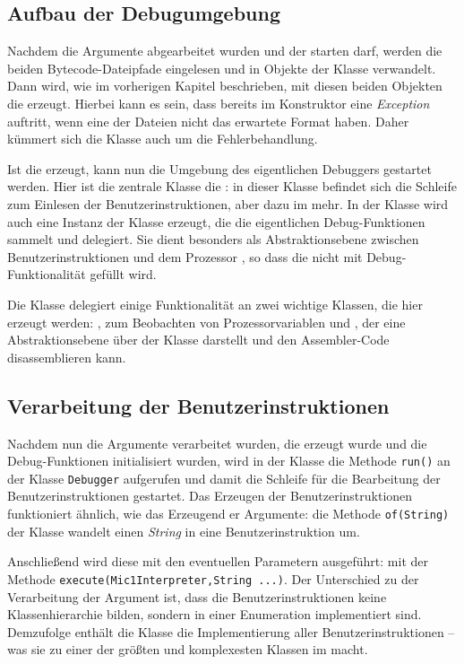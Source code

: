 \subsection{Aufbau der Debugumgebung}
Nachdem die Argumente abgearbeitet wurden und der \md{} starten darf, werden die beiden Bytecode-Dateipfade eingelesen und in Objekte der Klasse  verwandelt. Dann wird, wie im vorherigen Kapitel beschrieben, mit diesen beiden Objekten die \mic{} erzeugt. Hierbei kann es sein, dass bereits im Konstruktor eine \emph{Exception} auftritt, wenn eine der Dateien nicht das erwartete Format haben. Daher kümmert sich die Klasse  auch um die Fehlerbehandlung.

Ist die \mic{} erzeugt, kann nun die Umgebung des eigentlichen Debuggers gestartet werden. Hier ist die zentrale Klasse die : in dieser Klasse befindet sich die Schleife zum Einlesen der Benutzerinstruktionen, aber dazu im  mehr. In der Klasse  wird auch eine Instanz der Klasse  erzeugt, die die eigentlichen Debug-Funktionen sammelt und delegiert. Sie dient besonders als Abstraktionsebene zwischen Benutzerinstruktionen und dem Prozessor \mic{}, so dass die \mic{} nicht mit Debug-Funktionalität gefüllt wird.

Die Klasse  delegiert einige Funktionalität an zwei wichtige Klassen, die hier erzeugt werden: , zum Beobachten von Prozessorvariablen und , der eine Abstraktionsebene über der Klasse  darstellt und den Assembler-Code disassemblieren kann.


\subsection{Verarbeitung der Benutzerinstruktionen}
Nachdem nun die Argumente verarbeitet wurden, die \mic{} erzeugt wurde und die Debug-Funktionen initialisiert wurden, wird in der Klasse  die Methode \texttt{run()} an der Klasse \texttt{Debugger} aufgerufen und damit die Schleife für die Bearbeitung der Benutzerinstruktionen gestartet. Das Erzeugen der Benutzerinstruktionen funktioniert ähnlich, wie das Erzeugend er Argumente: die Methode \texttt{of(String)} der Klasse  wandelt einen \emph{String} in eine Benutzerinstruktion um.

Anschließend wird diese mit den eventuellen Parametern ausgeführt: mit der Methode \texttt{execute(Mic1Interpreter,String ...)}. Der Unterschied zu der Verarbeitung der Argument ist, dass die Benutzerinstruktionen keine Klassenhierarchie bilden, sondern in einer Enumeration implementiert sind. Demzufolge enthält die Klasse  die Implementierung aller Benutzerinstruktionen -- was sie zu einer der größten und komplexesten Klassen im \md{} macht.


